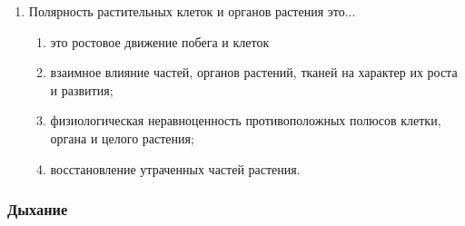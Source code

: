 \begin{enumerate}
\item Полярность растительных клеток и органов растения это...
\begin{enumerate}
	\item это ростовое движение побега и клеток
	\item взаимное влияние частей, органов растений, тканей на характер их роста и развития; 
	\item физиологическая неравноценность противоположных полюсов клетки, органа и целого растения; 
	\item восстановление утраченных частей растения.
\end{enumerate}

\end{enumerate}

\subsubsection*{Дыхание}

